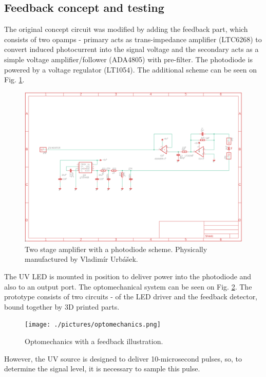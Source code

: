 \subsection{Feedback concept and testing}

The original concept circuit was modified by adding the feedback part, which consists of two opamps - primary acts as trans-impedance amplifier (LTC6268) to convert induced photocurrent into the signal voltage and the secondary acts as a simple voltage amplifier/follower (ADA4805) with pre-filter. The photodiode is powered by a voltage regulator (LT1054). The additional scheme can be seen on Fig. \ref{Amplifier}.
   
\begin{figure}[H]
 \centering
 \includegraphics[scale=0.45]{./pictures/FeedBackCirc.png}
 \caption{Two stage amplifier with a photodiode scheme. Physically manufactured by Vladimír Urbášek.}
 \label{Amplifier}
\end{figure}

The UV LED is mounted in position to deliver power into the photodiode and also to an output port. The optomechanical system can be seen on Fig. \ref{Optomechanics}. The prototype consists of two circuits - of the LED driver and the feedback detector, bound together by 3D printed parts.

\begin{figure}[H]
 \centering
 \texttt{[image: ./pictures/optomechanics.png]}
 \caption{Optomechanics with a feedback illustration.}
 \label{Optomechanics}
\end{figure}


However, the UV source is designed to deliver 10-microsecond pulses, so, to determine the signal level, it is necessary to sample this pulse. 

